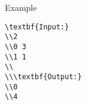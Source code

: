 Example
\begin{verbatim}
\textbf{Input:}
\\2
\\0 3
\\1 1
\\
\\\textbf{Output:}
\\0
\\4\end{verbatim}